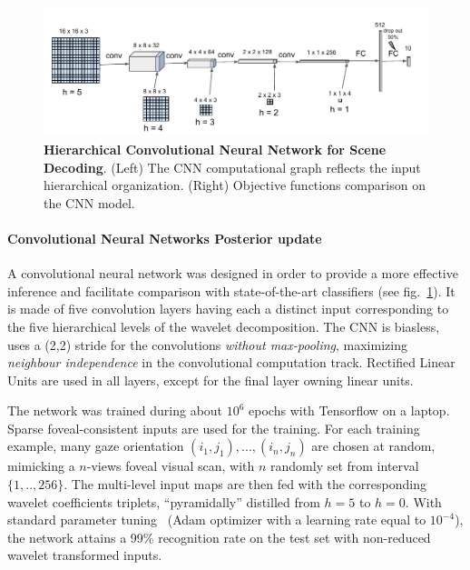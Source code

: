\documentclass[12pt,twoside,openright]{article}
\begin{document}
\begin{figure}
	\centerline{
		\includegraphics[width = \linewidth]{img/frontiers-convolutional.pdf} 
	}
	\vspace{-.2cm}
	\caption{\textbf{Hierarchical Convolutional Neural Network for Scene Decoding}. (Left) The CNN computational graph reflects the input hierarchical organization. (Right) Objective functions comparison on the CNN model.}\label{fig:CNN}
\end{figure}

\paragraph{Convolutional Neural Networks Posterior update}
A convolutional neural network was designed in order to provide a more effective {\color{Purple} inference} and facilitate comparison with state-of-the-art classifiers (see fig.~\ref{fig:CNN}). 
It is made of five convolution layers having each a distinct input corresponding to the five hierarchical levels of the wavelet decomposition. 
The CNN is biasless, uses a (2,2) stride for the convolutions \emph{without max-pooling}, maximizing \emph{neighbour independence} in the convolutional computation track.
Rectified Linear Units are used in all layers, except for the final layer owning linear units. 

The network was trained during about $10^6$ epochs with Tensorflow on a laptop.
{\color{Purple} Sparse foveal-consistent inputs are used for the training. For each training example, many gaze orientation $(i_1,j_1), ..., (i_n,j_n)$ are chosen at random, mimicking a $n$-views foveal visual scan, with $n$ randomly set from interval $\{1,..,256\}$. The multi-level input maps are then fed with the corresponding wavelet coefficients triplets, “pyramidally” distilled from $h = 5$ to $h = 0$.}  With standard parameter tuning { \color{Purple}(Adam optimizer \citep{kingma2014adam} with a learning rate equal to $10^{-4}$)}, the network attains a 99\% recognition rate on the test set with non-{\color{Purple}reduced} wavelet transformed inputs. 
\end{document}
